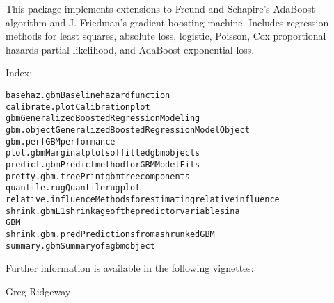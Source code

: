 \documentclass{article}
\begin{document}
\begin{Description}\relax
This package implements extensions to Freund and
Schapire's AdaBoost algorithm and J. Friedman's gradient
boosting machine. Includes regression methods for least
squares, absolute loss, logistic, Poisson, Cox proportional
hazards partial likelihood, and AdaBoost exponential loss.
\end{Description}
\begin{Details}\relax
{}

Index:
\begin{alltt}
basehaz.gbm             Baseline hazard function
calibrate.plot          Calibration plot
gbm                     Generalized Boosted Regression Modeling
gbm.object              Generalized Boosted Regression Model Object
gbm.perf                GBM performance
plot.gbm                Marginal plots of fitted gbm objects
predict.gbm             Predict method for GBM Model Fits
pretty.gbm.tree         Print gbm tree components
quantile.rug            Quantile rug plot
relative.influence      Methods for estimating relative influence
shrink.gbm              L1 shrinkage of the predictor variables in a
                        GBM
shrink.gbm.pred         Predictions from a shrunked GBM
summary.gbm             Summary of a gbm object
\end{alltt}

Further information is available in the following vignettes:
\end{Details}
\begin{Author}\relax
Greg Ridgeway 
\end{Author}
\end{document}
